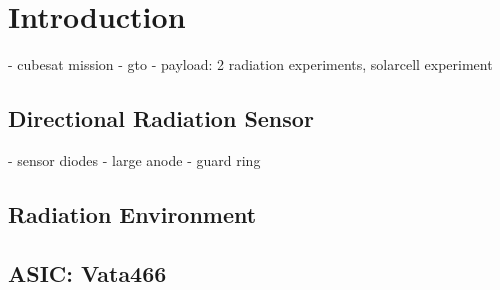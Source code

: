 \section{Introduction}
\label{sec:introduction}
- cubesat mission
- gto
- payload: 2 radiation experiments, solarcell experiment

\subsection{Directional Radiation Sensor}
\label{sec:radiation_sensor}
- sensor diodes
- large anode
- guard ring

\subsection{Radiation Environment}
\label{sec:radiation_environment}

\subsection{ASIC: Vata466}
\label{sec:asic}

